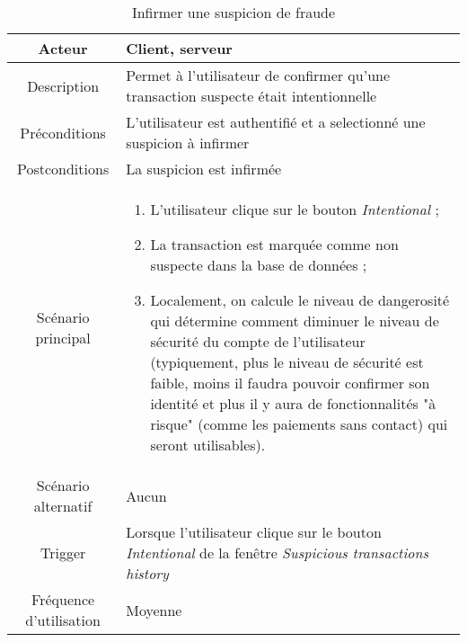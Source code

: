 \documentclass{article}
\begin{document}
\begin{table}

\begin{tabular}{|c|p{11cm}|}
\hline
Acteur & Client, serveur \\
\hline
Description & Permet à l'utilisateur de confirmer qu'une transaction suspecte était intentionnelle \\
\hline
Préconditions & L'utilisateur est authentifié et a selectionné une suspicion à infirmer \\
\hline
Postconditions & La suspicion est infirmée \\
\hline
Scénario principal & \begin{enumerate}
\item L'utilisateur clique sur le bouton \emph{Intentional} ;
\item La transaction est marquée comme non suspecte dans la base de données ;
\item Localement, on calcule le niveau de dangerosité qui détermine comment diminuer le niveau de sécurité du compte de l'utilisateur (typiquement, plus le niveau de sécurité est faible, moins il faudra pouvoir confirmer son identité et plus il y aura de fonctionnalités "à risque" (comme les paiements sans contact) qui seront utilisables).
\end{enumerate} \\
\hline
Scénario alternatif & Aucun \\
\hline
Trigger & Lorsque l'utilisateur clique sur le bouton \emph{Intentional} de la fenêtre  \emph{Suspicious transactions history} \\
\hline
Fréquence d'utilisation & Moyenne \\
\hline
\end{tabular}

\caption{Infirmer une suspicion de fraude}

\end{table}
\end{document}
